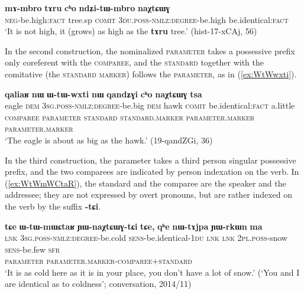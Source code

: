 \documentclass[oneside,a4paper,11pt]{article}
\newcommand{\ipa}[1]{{\phon\textbf{#1}}} %
\begin{document}
\begin{exe}
\ex \label{ex:ndZitWmbro}
\gll 
\ipa{mɤ-mbro} 	\ipa{tɤru} 	\ipa{cʰo} 	\ipa{ndʑi-tɯ-mbro} 	\ipa{naχtɕɯɣ} \\
\textsc{neg}-be.high:\textsc{fact} tree.sp \textsc{comit} \textsc{3du.poss-nmlz:degree}-be.high be.identical:\textsc{fact} \\
\glt `It is not high, it (grows) as high as the \ipa{tɤru} tree.' (hist-17-xCAj, 56)
\end{exe}

In the second construction, the nominalized \textsc{parameter} takes a possessive prefix only coreferent with the \textsc{comparee}, and the \textsc{standard}  together with the comitative (the \textsc{standard marker}) follows the \textsc{parameter}, as in (\ref{ex:WtWwxti}).

\begin{exe}
\ex \label{ex:WtWwxti}
\glll
\ipa{qaliaʁ} 	\ipa{nɯ} 	\ipa{ɯ-tɯ-wxti} 	\ipa{nɯ} 	\ipa{qandʑɣi} 	\ipa{cʰo} 	\ipa{naχtɕɯɣ} 	\ipa{tsa} 	\\
eagle \textsc{dem} \textsc{3sg.poss-nmlz:degree}-be.big \textsc{dem} hawk \textsc{comit} be.identical:\textsc{fact} a.little  \\
{\textsc{comparee}} { } \textsc{parameter} { } {\textsc{standard}} \textsc{standard.marker} \textsc{parameter.marker}  \textsc{parameter.marker} \\
\glt `The eagle is about as big as the hawk.' (19-qandZGi, 36)
\end{exe}

In the third construction, the parameter takes a third person singular possessive prefix, and the two comparees are indicated by person indexation on the verb. In (\ref{ex:WtWmWCtaR}), the standard and the comparee are the speaker and the addressee; they are not expressed by overt pronouns, but are rather indexed on the verb by the suffix \ipa{-tɕi}.

\begin{exe}
\ex \label{ex:WtWmWCtaR}
\glll
\ipa{tɕe} 	\ipa{ɯ-tɯ-mɯɕtaʁ} 	\ipa{ɲɯ-naχtɕɯɣ-tɕi} 	\ipa{tɕe,} 	\ipa{qʰe} 	\ipa{nɯ-tɤjpa} 	\ipa{ɲɯ-rkɯn} 	\ipa{ma} \\
\textsc{lnk} \textsc{3sg.poss-nmlz:degree}-be.cold \textsc{sens}-be.identical-\textsc{1du} \textsc{lnk} \textsc{lnk} \textsc{2pl.poss}-snow \textsc{sens}-be.few \textsc{sfr} \\
{ } \textsc{parameter} \textsc{parameter.marker-comparee+standard} \\
\glt `It is as cold here as it is in your place, you don't have a lot of snow.' (`You and I are identical as to coldness'; conversation, 2014/11)
\end{exe}
\end{document}
